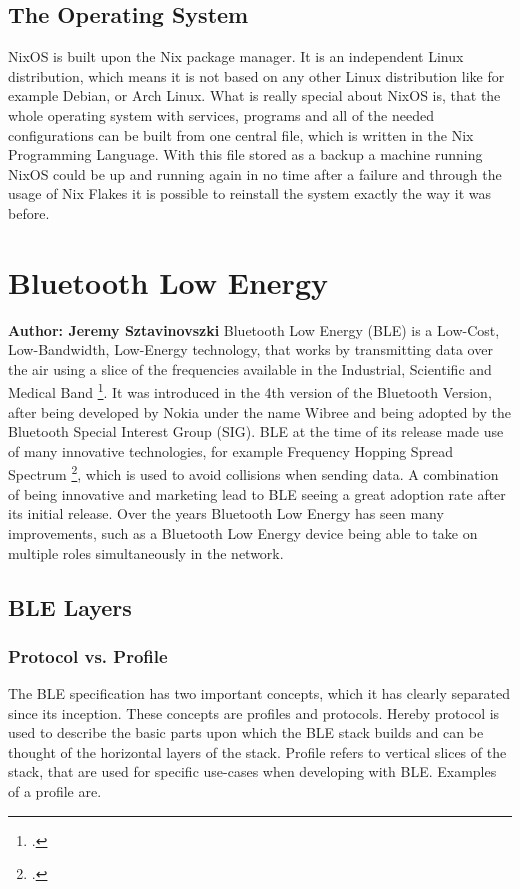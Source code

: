 \subsection{The Operating System}
NixOS is built upon the Nix package manager. It is an independent Linux distribution, which means it is not based on any other Linux distribution like for example Debian, or Arch Linux.
What is really special about NixOS is, that the whole operating system with services, programs and all of the needed configurations can be built from one central file, which is written in the Nix Programming Language.
With this file stored as a backup a machine running NixOS could be up and running again in no time after a failure and through the usage of Nix Flakes it is possible to reinstall the system exactly the way it was before.

\section{Bluetooth Low Energy}
\textbf{Author: Jeremy Sztavinovszki}
Bluetooth Low Energy (BLE) is a Low-Cost, Low-Bandwidth, Low-Energy technology, that works by transmitting data over the air using a slice of the frequencies available in the Industrial, Scientific and Medical Band \footcite{ism}.
It was introduced in the 4th version of the Bluetooth Version, after being developed by Nokia under the name Wibree and being adopted by the Bluetooth Special Interest Group (SIG). BLE at the time of its release made use of many
innovative technologies, for example Frequency Hopping Spread Spectrum \footcite{fhss}, which is used to avoid collisions when sending data. A combination of being innovative and marketing lead to BLE seeing a great adoption rate
after its initial release. Over the years Bluetooth Low Energy has seen many improvements, such as a Bluetooth Low Energy device being able to take on multiple roles simultaneously in the network.

\subsection{BLE Layers}
\subsubsection{Protocol vs. Profile}
The BLE specification has two important concepts, which it has clearly separated since its inception. These concepts are profiles and protocols. Hereby protocol is used to describe
the basic parts upon which the BLE stack builds and can be thought of the horizontal layers of the stack. Profile refers to vertical slices of the stack, that are used for specific use-cases when developing with BLE. Examples of a profile are.

